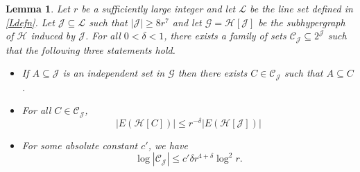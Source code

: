 \documentclass[11pt]{amsart}
\newcommand{\cL}{\mathcal{L}}
\newcommand{\cH}{\mathcal{H}}
\newcommand{\cG}{\mathcal{G}}
\newcommand{\cJ}{\mathcal{J}}
\newcommand{\cC}{\mathcal{C}}
\newtheorem{lemma}{Lemma}
\theoremstyle{remark}
\begin{document}
\begin{lemma} \label{lem:cont1}
   Let $r$ be a sufficiently large integer and let $\cL$ be the line set defined in \eqref{Ldefn}. Let $\mathcal J \subseteq \mathcal L$ such that $|\cJ| \geq 8r^7$ and let $\cG=\mathcal H[ \mathcal J]$ be the subhypergraph of $\mathcal H$ induced by $\mathcal J$. For all $0<\delta <1$, there exists a family of sets $\mathcal C_{\mathcal J} \subseteq 2^{\mathcal J}$ such that the following three statements hold.
    \begin{itemize}
        \item If $A \subseteq \mathcal J$ is an independent set in $\cG$ then there exists $C \in \mathcal C_{ \mathcal J}$ such that $A \subseteq C$.
        \item For all $C \in \mathcal C_{ \mathcal J}$,
        \[
        |E(\cH[C])| \leq r^{-\delta} |E( \cH[\cJ])|
        \]
        \item For some absolute constant $c'$, we have 
        \[
        \log | \cC_{\cJ}| \leq c'\delta r^{4+\delta} \log^2 r .
        \]
    \end{itemize}
\end{lemma}
\end{document}

